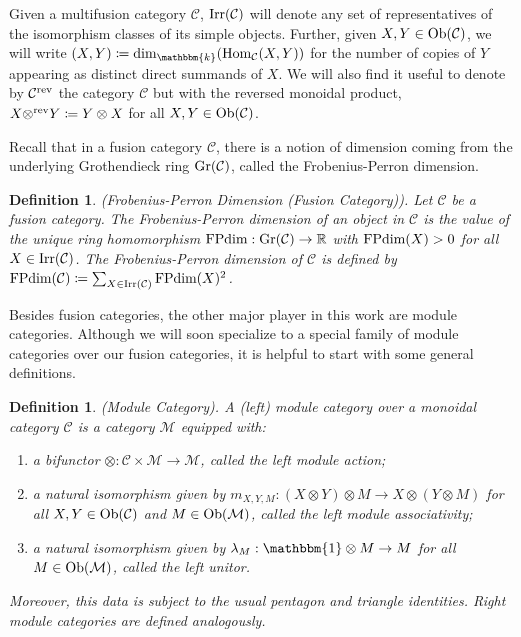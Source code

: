 \documentclass[12pt, reqno]{amsart}
\numberwithin{equation}{section}
\theoremstyle{plainspace}
\theoremstyle{definitionspace}
\newtheorem{definition}[theorem]{Definition}
\theoremstyle{remarkspace}
\newcommand{\mathcat}[1]{\mathcal{#1}}
\newcommand{\Ob}{\textup{Ob}}
\newcommand{\Hom}[2][]{
	\ifthenelse{\equal{#2}{}}
		{\textup{Hom}_{#1}}
		{\textup{Hom}_{#1}\!\left(#2\right)}
}
\newcommand{\revcat}[1]{{#1}^{\textup{rev}}}
\newcommand{\Irr}{\textup{Irr}}
\newcommand{\Gr}{\textup{Gr}}
\newcommand{\dimh}[2]{\left(#1, #2\right)}
\newcommand{\FPdim}{\textup{FPdim}}
\begin{document}
\noindent Given a multifusion category $\mathcat{C}$, $\Irr(\mathcat{C})$ will denote any set of representatives of the isomorphism classes of its simple objects. Further, given $X, Y \in \Ob(\mathcat{C})$, we will write $\dimh{X}{Y} \coloneqq \dim_{\mathbbm{k}}(\Hom[\mathcat{C}]{X, Y})$ for the number of copies of $Y$ appearing as distinct direct summands of $X$. We will also find it useful to denote by $\revcat{\mathcat{C}}$ the category $\mathcat{C}$ but with the reversed monoidal product, $X \revcat{\otimes} Y \coloneqq Y \otimes X$ for all $X, Y \in \Ob(\mathcat{C})$.
\newline

\noindent Recall that in a fusion category $\mathcat{C}$, there is a notion of dimension coming from the underlying Grothendieck ring $\Gr(\mathcat{C})$, called the Frobenius-Perron dimension.
\newline

\begin{definition}\label{def:frobenius-perron_dimension}{\em (Frobenius-Perron Dimension (Fusion Category)).} \cite[Section 8.1]{Etingof_2005}
Let $\mathcat{C}$ be a fusion category. The {\em Frobenius-Perron dimension} of an object in $\mathcat{C}$ is the value of the unique ring homomorphism $\FPdim : \Gr(\mathcat{C}) \to \mathbb{R}$ with $\FPdim(X) > 0$ for all $X \in \Irr(\mathcat{C})$. The Frobenius-Perron dimension of $\mathcat{C}$ is defined by $\FPdim(\mathcat{C}) \coloneqq \sum_{X \in \Irr(\mathcat{C})}{\FPdim(X)^2}$.
\end{definition}
\leavevmode

\noindent Besides fusion categories, the other major player in this work are module categories. Although we will soon specialize to a special family of module categories over our fusion categories, it is helpful to start with some general definitions.
\newline

\begin{definition}\label{def:module_category}{\em (Module Category).} \cite[Definition 7.1.2]{Etingof_2016}
A {\em (left) module category} over a monoidal category $\mathcat{C}$ is a category $\mathcat{M}$ equipped with:
\begin{enumerate}[start=1, leftmargin=1.5cm, label={(\arabic*).}]
\item a bifunctor $\otimes : \mathcat{C} \times \mathcat{M} \to \mathcat{M}$, called the {\em left module action};
\item a natural isomorphism given by $m_{X,Y,M} : (X \otimes Y) \otimes M \to X \otimes (Y \otimes M)$ for all $X, Y \in \Ob(\mathcat{C})$ and $M \in \Ob(\mathcat{M})$, called the {\em left module associativity};
\item a natural isomorphism given by $\lambda_M : \mathbbm{1} \otimes M \to M$ for all $M \in \Ob(\mathcat{M})$, called the {\em left unitor}.
\end{enumerate}
\noindent Moreover, this data is subject to the usual pentagon and triangle identities. Right module categories are defined analogously.
\end{definition}
\leavevmode
\end{document}
